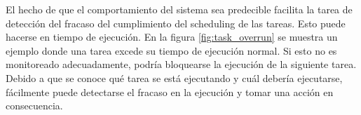 






El hecho de que el comportamiento del sistema sea predecible facilita la tarea de detección del fracaso del cumplimiento del scheduling de las tareas. Esto puede hacerse en tiempo de ejecución. En la figura \ref{fig:task_overrun} se muestra un ejemplo donde una tarea excede su tiempo de ejecución normal. Si esto no es monitoreado adecuadamente, podría bloquearse la ejecución de la siguiente tarea. Debido a que se conoce qué tarea se está ejecutando y cuál debería ejecutarse, fácilmente puede detectarse el fracaso en la ejecución y tomar una acción en consecuencia.


